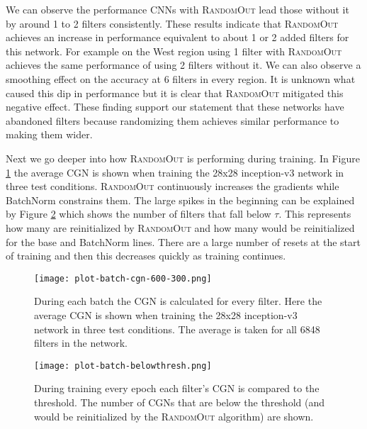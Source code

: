 \documentclass{article}
\begin{document}
We can observe the performance CNNs with \textsc{RandomOut} lead those without it by around 1 to 2 filters consistently. These results indicate that \textsc{RandomOut} achieves an increase in performance equivalent to about 1 or 2 added filters for this network. For example on the West region using 1 filter with \textsc{RandomOut} achieves the same performance of using 2 filters without it. We can also observe a smoothing effect on the accuracy at 6 filters in every region. It is unknown what caused this dip in performance but it is clear that \textsc{RandomOut} mitigated this negative effect. These finding support our statement that these networks have abandoned filters because randomizing them achieves similar performance to making them wider. 




	
Next we go deeper into how \textsc{RandomOut} is performing during training. In Figure \ref{fig:batch-cgn} the average CGN is shown when training the 28x28 inception-v3 network in three test conditions. \textsc{RandomOut} continuously increases the gradients while BatchNorm constrains them. The large spikes in the beginning can be explained by Figure \ref{fig:batch-belowthresh} which shows the number of filters that fall below $\tau$. This represents how many are reinitialized by \textsc{RandomOut} and how many would be reinitialized for the base and BatchNorm lines. There are a large number of resets at the start of training and then this decreases quickly as training continues.



	



\begin{figure}
\centering
\texttt{[image: plot-batch-cgn-600-300.png]}
    \caption{During each batch the CGN is calculated for every filter. Here the average CGN is shown when training the 28x28 inception-v3 network in three test conditions. The average is taken for all 6848 filters in the network.}
    \label{fig:batch-cgn}
\end{figure}



\begin{figure}
\texttt{[image: plot-batch-belowthresh.png]}
    \caption{During training every epoch each filter's CGN is compared to the threshold. The number of CGNs that are below the threshold (and would be reinitialized by the \textsc{RandomOut} algorithm) are shown.}
    \label{fig:batch-belowthresh}
\end{figure}
\end{document}
